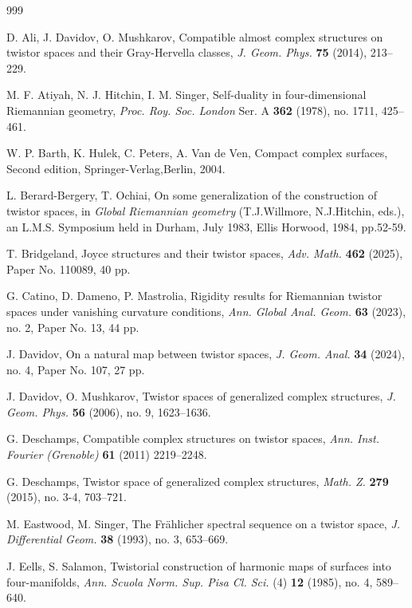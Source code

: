 \documentclass[11pt]{amsart}
\theoremstyle{definition}
\theoremstyle{plain}
\theoremstyle{definition}
\theoremstyle{plain}
\theoremstyle{remark}
\theoremstyle{plain}
\begin{document}
\begin{thebibliography}{999}

  D. Ali,  J.  Davidov,  O. Mushkarov,  Compatible almost complex structures on twistor spaces and their Gray-Hervella classes, 
\emph{J. Geom. Phys.}  \textbf{75} (2014), 213--229.



M. F. Atiyah, N. J. Hitchin, I. M. Singer, Self-duality in four-dimensional Riemannian geometry, \emph{Proc. Roy. Soc. London} Ser. A  \textbf{362} (1978), no. 1711, 425--461.


 W. P. Barth,  K. Hulek,  C.  Peters,  A. Van de Ven, Compact  complex surfaces, Second edition, Springer-Verlag,Berlin, 2004.


  L. Berard-Bergery,  T. Ochiai,  On some generalization of the construction of twistor spaces,
in \emph{Global Riemannian geometry} (T.J.Willmore, N.J.Hitchin, eds.), an L.M.S. Symposium
held in Durham, July 1983, Ellis Horwood, 1984, pp.52-59.

 T. Bridgeland, Joyce structures and their twistor spaces, \emph{Adv. Math.}   \textbf{462} (2025), Paper No. 110089, 40 pp.

 G. Catino, D. Dameno, P. Mastrolia, Rigidity results for Riemannian twistor spaces under vanishing curvature conditions, \emph{Ann. Global Anal. Geom.}  \textbf{63} (2023), no. 2, Paper No. 13, 44 pp.

 J. Davidov, 
On a natural map between twistor spaces, 
\emph{J. Geom. Anal.}  \textbf{34} (2024), no. 4, Paper No. 107, 27 pp.

  J. Davidov, O. Mushkarov, Twistor spaces of generalized complex structures, \emph{J. Geom. Phys.} \textbf{56}  (2006), no. 9, 1623--1636.


 G. Deschamps,  Compatible complex structures on twistor spaces, \emph{Ann. Inst. Fourier (Grenoble)}  \textbf{61} (2011) 2219--2248.

 G. Deschamps,  Twistor space of generalized complex structures, \emph{Math. Z.}  \textbf{279} (2015), no. 3-4, 703--721.

M. Eastwood,  M. Singer, 
The Fr\"ahlicher spectral sequence on a twistor space, 
\emph{J. Differential Geom.}  \textbf{38} (1993), no. 3, 653--669.


 J.  Eells,  S. Salamon, 
Twistorial construction of harmonic maps of surfaces into four-manifolds,
\emph{Ann. Scuola Norm. Sup. Pisa Cl. Sci.} (4) \textbf{12}  (1985), no. 4, 589--640.


\end{thebibliography}
\end{document}
